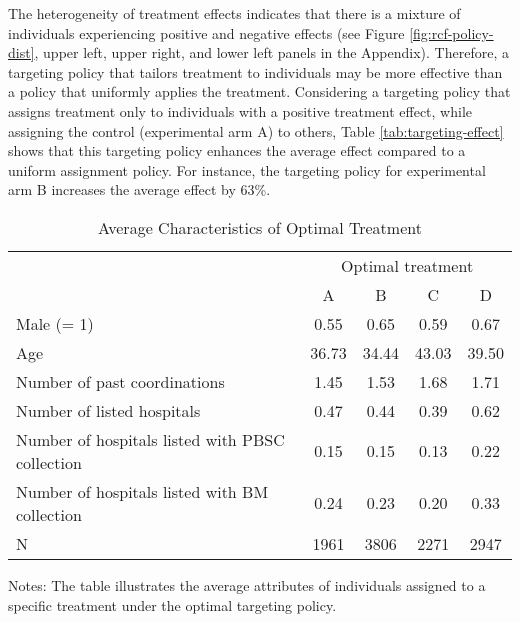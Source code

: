 \documentclass[
  11pt,
  a4paper
]{article}
\begin{document}
The heterogeneity of treatment effects indicates that there is a mixture of individuals experiencing positive and negative effects (see Figure \ref{fig:rcf-policy-dist}, upper left, upper right, and lower left panels in the Appendix). Therefore, a targeting policy that tailors treatment to individuals may be more effective than a policy that uniformly applies the treatment. Considering a targeting policy that assigns treatment only to individuals with a positive treatment effect, while assigning the control (experimental arm A) to others, Table \ref{tab:targeting-effect} shows that this targeting policy enhances the average effect compared to a uniform assignment policy. For instance, the targeting policy for experimental arm B increases the average effect by 63\%.

\begin{table}

\caption{\label{tab:targeting-character}Average Characteristics of Optimal Treatment}
\centering
\fontsize{9}{11}\selectfont
\begin{threeparttable}
\begin{tabular}[t]{lcccc}
\toprule
\multicolumn{1}{c}{ } & \multicolumn{4}{c}{Optimal treatment} \\
\cmidrule(l{3pt}r{3pt}){2-5}
 & A & B & C & D\\
\midrule
Male (= 1) & 0.55 & 0.65 & 0.59 & 0.67\\
Age & 36.73 & 34.44 & 43.03 & 39.50\\
Number of past coordinations & 1.45 & 1.53 & 1.68 & 1.71\\
Number of listed hospitals & 0.47 & 0.44 & 0.39 & 0.62\\
Number of hospitals listed with PBSC collection & 0.15 & 0.15 & 0.13 & 0.22\\
Number of hospitals listed with BM collection & 0.24 & 0.23 & 0.20 & 0.33\\
N & 1961 & 3806 & 2271 & 2947\\
\bottomrule
\end{tabular}
\begin{tablenotes}
\item Notes: The table illustrates the average attributes of individuals assigned to a specific treatment under the optimal targeting policy.
\end{tablenotes}
\end{threeparttable}
\end{table}
\end{document}
